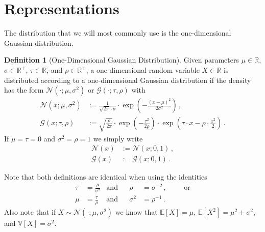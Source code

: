 \documentclass[a4paper]{article}
\newcommand{\Real}{{\mathbb R}}
\newcommand{\Normal}[3]{{\mathcal N} \left({#1};{#2},{#3}\right)}
\newcommand{\Gauss}[3]{{\mathcal G} \left({#1};{#2},{#3}\right)}
\newcommand{\NormalStandard}[1]{{\mathcal N} \left({#1}\right)}
\newcommand{\GaussStandard}[1]{{\mathcal G} \left({#1}\right)}
\newcommand{\expect}[1]{{\mathbb E \left[ {#1} \right]}}
\newcommand{\var}[1]{{\mathbb V \left[ {#1} \right]}}
\theoremstyle{definition}
\newtheorem{definition}{Definition}
\begin{document}
\section*{Representations}
The distribution that we will most commonly use is the one-dimensional Gaussian distribution.
\begin{definition}[One-Dimensional Gaussian Distribution]
    Given parameters $\mu \in \Real$, $\sigma \in \Real^+$, $\tau \in \Real$, and $\rho \in \Real^+$, a one-dimensional random variable $X \in \Real$ is distributed according to a one-dimensional Gaussian distribution if the density has the form $\Normal{\cdot}{\mu}{\sigma^2}$ or $\Gauss{\cdot}{\tau}{\rho}$ with
    \begin{align}
        \Normal{x}{\mu}{\sigma^2} & := \frac{1}{\sqrt{2\pi}\cdot \sigma} \cdot \exp \left( -\frac{(x-\mu)^2}{2\sigma^2}\right) \,, \label{eq:Normal_definition} \\
        \Gauss{x}{\tau}{\rho}     & := \sqrt{\frac{\rho}{2\pi}} \cdot \exp\left(-\frac{\tau^2}{2\rho} \right) \cdot \exp \left(\tau\cdot x - \rho \cdot \frac{x^2}{2} \right) \,. \label{eq:Gauss_definition}
    \end{align}
    If $\mu = \tau = 0$ and $\sigma^2 = \rho = 1$ we simply write 
    \begin{align}
        \NormalStandard{x} & := \Normal{x}{0}{1} \,, \\
        \GaussStandard{x}  & := \Gauss{x}{0}{1} \,.
    \end{align}
\end{definition}
Note that both definitions are identical when using the identities
\begin{align}
    \tau & = \frac{\mu}{\sigma^2} & \mbox{and} &  & \rho     & = \sigma^{-2}\,,                                       &  &  & \mbox{or} \\
    \mu  & = \frac{\tau}{\rho}    & \mbox{and} &  & \sigma^2 & = \rho^{-1} \,. \label{eq:Gauss_Normal_transformation}
\end{align}
Also note that if $X \sim \Normal{\cdot}{\mu}{\sigma^2}$ we know that $\expect{X}=\mu$, $\expect{X^2}=\mu^2 + \sigma^2$, and $\var{X}=\sigma^2$.
\end{document}
